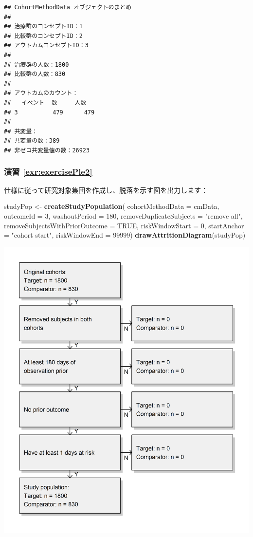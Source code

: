 \documentclass[
  11pt]{book}
\newenvironment{Shaded}{\begin{snugshade}}{\end{snugshade}}
\newcommand{\AttributeTok}[1]{\textcolor[rgb]{0.13,0.29,0.53}{#1}}
\newcommand{\ConstantTok}[1]{\textcolor[rgb]{0.56,0.35,0.01}{#1}}
\newcommand{\DecValTok}[1]{\textcolor[rgb]{0.00,0.00,0.81}{#1}}
\newcommand{\FunctionTok}[1]{\textcolor[rgb]{0.13,0.29,0.53}{\textbf{#1}}}
\newcommand{\NormalTok}[1]{#1}
\newcommand{\OtherTok}[1]{\textcolor[rgb]{0.56,0.35,0.01}{#1}}
\newcommand{\StringTok}[1]{\textcolor[rgb]{0.31,0.60,0.02}{#1}}
\theoremstyle{definition}
\theoremstyle{definition}
\theoremstyle{definition}
\theoremstyle{definition}
\theoremstyle{remark}
\begin{document}
\begin{verbatim}
## CohortMethodData オブジェクトのまとめ
## 
## 治療群のコンセプトID：1
## 比較群のコンセプトID：2
## アウトカムコンセプトID：3
## 
## 治療群の人数：1800
## 比較群の人数：830
## 
## アウトカムのカウント：
##   イベント  数     人数
## 3          479      479
## 
## 共変量：
## 共変量の数：389
## 非ゼロ共変量値の数：26923
\end{verbatim}

\subsubsection*{演習 \ref{exr:exercisePle2}}\label{ux6f14ux7fd2-refexrexerciseple2}

仕様に従って研究対象集団を作成し、脱落を示す図を出力します：

\begin{Shaded}
\begin{Highlighting}[]
\NormalTok{studyPop }\OtherTok{\textless{}{-}} \FunctionTok{createStudyPopulation}\NormalTok{(}
  \AttributeTok{cohortMethodData =}\NormalTok{ cmData,}
  \AttributeTok{outcomeId =} \DecValTok{3}\NormalTok{,}
  \AttributeTok{washoutPeriod =} \DecValTok{180}\NormalTok{,}
  \AttributeTok{removeDuplicateSubjects =} \StringTok{"remove all"}\NormalTok{,}
  \AttributeTok{removeSubjectsWithPriorOutcome =} \ConstantTok{TRUE}\NormalTok{,}
  \AttributeTok{riskWindowStart =} \DecValTok{0}\NormalTok{,}
  \AttributeTok{startAnchor =} \StringTok{"cohort start"}\NormalTok{,}
  \AttributeTok{riskWindowEnd =} \DecValTok{99999}\NormalTok{)}
\FunctionTok{drawAttritionDiagram}\NormalTok{(studyPop)}
\end{Highlighting}
\end{Shaded}

\begin{center}\includegraphics[width=0.8\linewidth]{images/SuggestedAnswers/attrition} \end{center}
\end{document}
